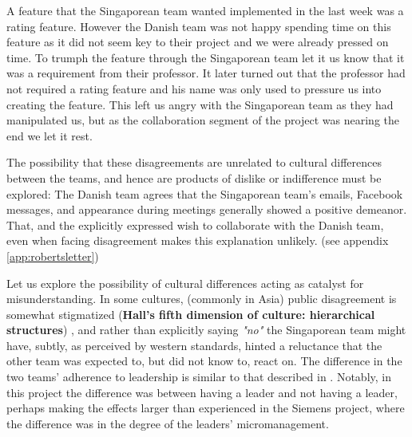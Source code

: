 A feature that the Singaporean team wanted implemented in the last week was
a rating feature. However the Danish team was not happy spending time on this
feature as it did not seem key to their project and we were already pressed on 
time. To trumph the feature through the Singaporean team let it us know
that it was a requirement from their professor. It later turned out that the
professor had not required a rating feature and  his name was only used
to pressure us into creating the feature. This left us angry with the 
Singaporean team as they had manipulated us, but as the collaboration
segment of the project was nearing the end we let it rest.

The possibility that these disagreements are unrelated to cultural differences
between the teams, and hence are products of dislike or indifference must be
explored: The Danish team agrees that the Singaporean team's emails, Facebook
messages, and appearance during meetings generally showed a positive demeanor.
That, and the explicitly expressed wish to collaborate with the Danish team,
even when facing disagreement makes this explanation unlikely. (see appendix
\ref{app:robertsletter})

Let us explore the possibility of cultural differences acting as catalyst for
misunderstanding. In some cultures, (commonly in Asia) public disagreement is
somewhat stigmatized (\textbf{Hall's fifth dimension of culture: hierarchical
structures}) \cite{surprises}\cite{herbsiemens}, and rather
than explicitly saying \emph{"no"} the Singaporean team might have, subtly, as
perceived by western standards, hinted a reluctance that the other team was
expected to, but did not know to, react on.
The difference in the two teams' adherence to leadership is similar to that
described in \cite{herbsiemens}. Notably, in this project the difference was
between having a leader and not having a leader, perhaps making the effects
larger than experienced in the Siemens project, where the difference was in the
degree of  the leaders' micromanagement.

